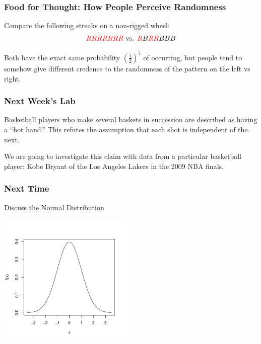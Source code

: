 \documentclass[handout]{beamer}
\newcommand{\blue}[1]{\textcolor{blue2}{#1}}
\begin{document}
\begin{frame}
\frametitle{Food for Thought: How People Perceive Randomness}
Compare the following streaks on a non-rigged wheel:
\begin{eqnarray*}
\textcolor{red}{R}\textcolor{red}{R}\textcolor{red}{R}\textcolor{red}{R}\textcolor{red}{R}\textcolor{red}{R}\textcolor{red}{R} \mbox{ vs. } \textcolor{red}{R}B\textcolor{red}{R}\textcolor{red}{R}BBB
\end{eqnarray*}

\pause Both have the exact same probability $\left(\frac{1}{2}\right)^{7}$ of occurring, but people tend to somehow give different credence to the randomness of the pattern on the left vs right.
\end{frame}


\begin{frame}
\frametitle{Next Week's Lab}

Basketball players who make several baskets in succession are described as having a ``hot hand.''  This refutes the assumption that each shot is \blue{independent} of the next. 

\vspace{0.5cm}

We are going to investigate this claim with data from a particular basketball player: Kobe Bryant of the Los Angeles Lakers in the 2009 NBA finals.

\end{frame}


\begin{frame}[fragile]
\frametitle{Next Time}

Discuss the Normal Distribution

\begin{center}
   \includegraphics[width=2.5in]{figure/standard_normal.pdf} 
\end{center}

\end{frame}
\end{document}
